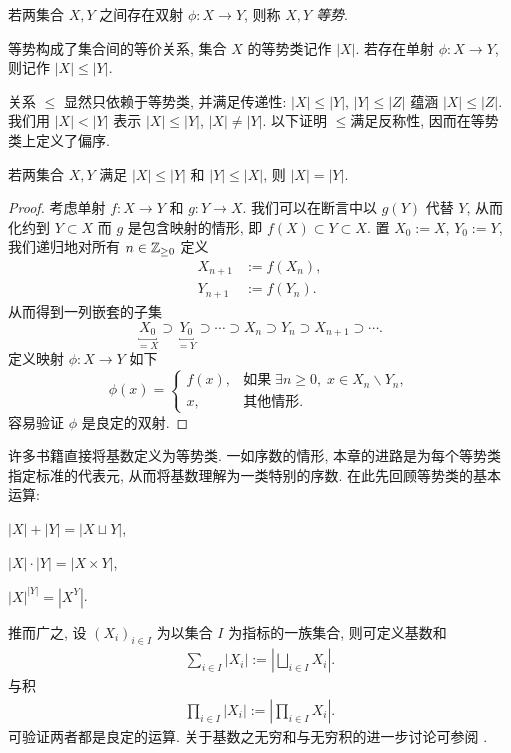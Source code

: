 \begin{definition}
	若两集合 $X, Y$ 之间存在双射 $\phi: X \to Y$, 则称 $X, Y$ \emph{等势}.

	等势构成了集合间的等价关系, 集合 $X$ 的等势类记作 $|X|$. 若存在单射 $\phi: X \to Y$, 则记作 $|X| \leq |Y|$.
\end{definition}

关系 $\leq$ 显然只依赖于等势类, 并满足传递性: $|X| \leq |Y|$, $|Y| \leq |Z|$ 蕴涵 $|X| \leq |Z|$. 我们用 $|X| < |Y|$ 表示 $|X| \leq |Y|$, $|X| \neq |Y|$.  以下证明 $\leq $满足反称性, 因而在等势类上定义了偏序.

\begin{theorem}\label{prop:Schröder-Bernstein}
	若两集合 $X,Y$ 满足 $|X| \leq |Y|$ 和 $|Y| \leq |X|$, 则 $|X|=|Y|$.
\end{theorem}
\begin{proof}
	考虑单射 $f: X \to Y$ 和 $g: Y \to X$. 我们可以在断言中以 $g(Y)$ 代替 $Y$, 从而化约到 $Y \subset X$ 而 $g$ 是包含映射的情形, 即 $f(X) \subset Y \subset X$. 置 $X_0 := X$, $Y_0 := Y$, 我们递归地对所有 $n \in \mathbb{Z}_{\geq 0}$ 定义
	\begin{align*}
		X_{n+1} & := f(X_n), \\
		Y_{n+1} & := f(Y_n).
	\end{align*}
	从而得到一列嵌套的子集
	\[ \underbracket{X_0}_{=X} \supset \underbracket{Y_0}_{=Y} \supset \cdots \supset X_n \supset Y_n \supset X_{n+1} \supset \cdots . \]
	定义映射 $\phi: X \to Y$ 如下
	\[ \phi(x) = \begin{cases}
		f(x), & \text{如果}\; \exists n \geq 0, \; x \in X_n \smallsetminus Y_n, \\
		x, & \text{其他情形}.
	\end{cases} \]
	容易验证 $\phi$ 是良定的双射.
\end{proof}

许多书籍直接将基数定义为等势类. 一如序数的情形, 本章的进路是为每个等势类指定标准的代表元, 从而将基数理解为一类特别的序数. 在此先回顾等势类的基本运算:
\begin{compactenum}[(i)]
	\item $|X|+|Y| = |X \sqcup Y|$,
	\item $|X| \cdot |Y| = |X \times Y|$, 
	\item $|X|^{|Y|} = |X^Y|$.
\end{compactenum}
推而广之, 设 $(X_i)_{i \in I}$ 为以集合 $I$ 为指标的一族集合, 则可定义基数和
\begin{gather}\label{eqn:cardinal-infinite-sum}
	\sum_{i \in I} |X_i| := \left\lvert \bigsqcup_{i \in I} X_i \right\rvert.
\end{gather}
与积
\begin{gather}\label{eqn:cardinal-infinite-prod}
	\prod_{i \in I} |X_i| := \left\lvert \prod_{i \in I} X_i \right\rvert.
\end{gather}
可验证两者都是良定的运算. 关于基数之无穷和与无穷积的进一步讨论可参阅 \cite[pp.52-55]{Je03}.

